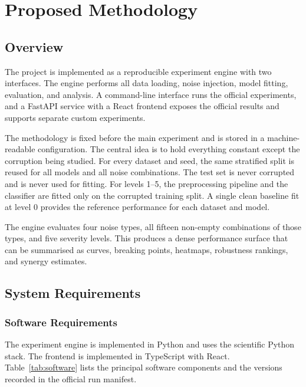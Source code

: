 \chapter{Proposed Methodology}

\section{Overview}

The project is implemented as a reproducible experiment engine with two interfaces. The engine performs all data loading, noise injection, model fitting, evaluation, and analysis. A command-line interface runs the official experiments, and a FastAPI service with a React frontend exposes the official results and supports separate custom experiments.

The methodology is fixed before the main experiment and is stored in a machine-readable configuration. The central idea is to hold everything constant except the corruption being studied. For every dataset and seed, the same stratified split is reused for all models and all noise combinations. The test set is never corrupted and is never used for fitting. For levels 1--5, the preprocessing pipeline and the classifier are fitted only on the corrupted training split. A single clean baseline fit at level 0 provides the reference performance for each dataset and model.

The engine evaluates four noise types, all fifteen non-empty combinations of those types, and five severity levels. This produces a dense performance surface that can be summarised as curves, breaking points, heatmaps, robustness rankings, and synergy estimates.

\section{System Requirements}

\subsection{Software Requirements}

The experiment engine is implemented in Python and uses the scientific Python stack. The frontend is implemented in TypeScript with React. Table~\ref{tab:software} lists the principal software components and the versions recorded in the official run manifest.

